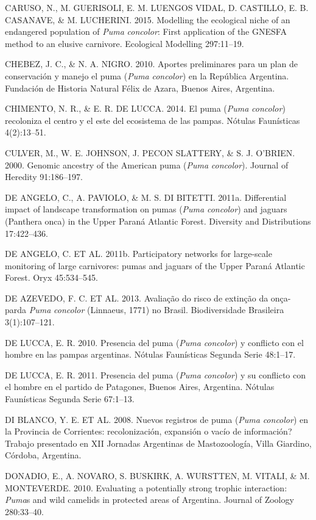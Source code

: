 \documentclass[
  x11names]{article}
\begin{document}
CARUSO, N., M. GUERISOLI, E. M. LUENGOS VIDAL, D. CASTILLO, E. B.
CASANAVE, \& M. LUCHERINI. 2015. Modelling the ecological niche of an
endangered population of \textit{Puma} \textit{concolor}: First
application of the GNESFA method to an elusive carnivore. Ecological
Modelling 297:11--19.

CHEBEZ, J. C., \& N. A. NIGRO. 2010. Aportes preliminares para un plan
de conservación y manejo el puma (\textit{Puma} \textit{concolor}) en la
República Argentina. Fundación de Historia Natural Félix de Azara,
Buenos Aires, Argentina.

CHIMENTO, N. R., \& E. R. DE LUCCA. 2014. El puma (\textit{Puma}
\textit{concolor}) recoloniza el centro y el este del ecosistema de las
pampas. Nótulas Faunísticas 4(2):13--51.

CULVER, M., W. E. JOHNSON, J. PECON SLATTERY, \& S. J. O'BRIEN. 2000.
Genomic ancestry of the American puma (\textit{Puma} \textit{concolor}).
Journal of Heredity 91:186--197.

DE ANGELO, C., A. PAVIOLO, \& M. S. DI BITETTI. 2011a. Differential
impact of landscape transformation on pumas (\textit{Puma}
\textit{concolor}) and jaguars (Panthera onca) in the Upper Paraná
Atlantic Forest. Diversity and Distributions 17:422--436.

DE ANGELO, C. ET AL. 2011b. Participatory networks for large-scale
monitoring of large carnivores: pumas and jaguars of the Upper Paraná
Atlantic Forest. Oryx 45:534--545.

DE AZEVEDO, F. C. ET AL. 2013. Avaliação do risco de extinção da
onça-parda \textit{Puma} \textit{concolor} (Linnaeus, 1771) no Brasil.
Biodiversidade Brasileira 3(1):107--121.

DE LUCCA, E. R. 2010. Presencia del puma (\textit{Puma}
\textit{concolor}) y conflicto con el hombre en las pampas argentinas.
Nótulas Faunísticas Segunda Serie 48:1--17.

DE LUCCA, E. R. 2011. Presencia del puma (\textit{Puma}
\textit{concolor}) y su conflicto con el hombre en el partido de
Patagones, Buenos Aires, Argentina. Nótulas Faunísticas Segunda Serie
67:1--13.

DI BLANCO, Y. E. ET AL. 2008. Nuevos registros de puma (\textit{Puma}
\textit{concolor}) en la Provincia de Corrientes: recolonización,
expansión o vacío de información? Trabajo presentado en XII Jornadas
Argentinas de Mastozoología, Villa Giardino, Córdoba, Argentina.

DONADIO, E., A. NOVARO, S. BUSKIRK, A. WURSTTEN, M. VITALI, \& M.
MONTEVERDE. 2010. Evaluating a potentially strong trophic interaction:
\textit{Puma}s and wild camelids in protected areas of Argentina.
Journal of Zoology 280:33--40.
\end{document}
